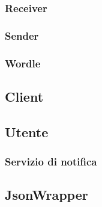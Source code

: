\subsubsection{Receiver}
\subsubsection{Sender}
\subsubsection{Wordle}

\subsection{Client}
\subsection{Utente}
\subsubsection{Servizio di notifica}

\subsection{JsonWrapper}
